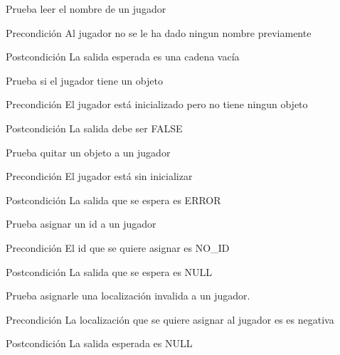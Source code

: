 \begin{DoxyRefList}
\item[\label{test__test000218}%
\hypertarget{test__test000218}{}%
Global \hyperlink{player__test_8c_a47ca2429d85f332295322002954e1c89}{test3\-\_\-player\-\_\-get\-\_\-name} ()]Prueba leer el nombre de un jugador \begin{DoxyPrecond}{Precondición}
Al jugador no se le ha dado ningun nombre previamente 
\end{DoxyPrecond}
\begin{DoxyPostcond}{Postcondición}
La salida esperada es una cadena vacía  
\end{DoxyPostcond}

\item[\label{test__test000002}%
\hypertarget{test__test000002}{}%
Global \hyperlink{player__test_8c_a956409720fca92e245d798491200f3d6}{test3\-\_\-player\-\_\-has\-\_\-object} ()]Prueba si el jugador tiene un objeto \begin{DoxyPrecond}{Precondición}
El jugador está inicializado pero no tiene ningun objeto 
\end{DoxyPrecond}
\begin{DoxyPostcond}{Postcondición}
La salida debe ser F\-A\-L\-S\-E  
\end{DoxyPostcond}

\item[\label{test__test000227}%
\hypertarget{test__test000227}{}%
Global \hyperlink{player__test_8c_af84155cb375301e75475a91ef522e191}{test3\-\_\-player\-\_\-remove\-\_\-object} ()]Prueba quitar un objeto a un jugador \begin{DoxyPrecond}{Precondición}
El jugador está sin inicializar 
\end{DoxyPrecond}
\begin{DoxyPostcond}{Postcondición}
La salida que se espera es E\-R\-R\-O\-R  
\end{DoxyPostcond}

\item[\label{test__test000209}%
\hypertarget{test__test000209}{}%
Global \hyperlink{player__test_8c_a721899e78b1e5e9e483fcc75f44fdf09}{test3\-\_\-player\-\_\-set\-\_\-id} ()]Prueba asignar un id a un jugador \begin{DoxyPrecond}{Precondición}
El id que se quiere asignar es N\-O\-\_\-\-I\-D 
\end{DoxyPrecond}
\begin{DoxyPostcond}{Postcondición}
La salida que se espera es N\-U\-L\-L  
\end{DoxyPostcond}

\item[\label{test__test000212}%
\hypertarget{test__test000212}{}%
Global \hyperlink{player__test_8c_a317c0c84ef6ef843c15d5bab4a6b8a38}{test3\-\_\-player\-\_\-set\-\_\-location} ()]Prueba asignarle una localización invalida a un jugador. \begin{DoxyPrecond}{Precondición}
La localización que se quiere asignar al jugador es es negativa 
\end{DoxyPrecond}
\begin{DoxyPostcond}{Postcondición}
La salida esperada es N\-U\-L\-L  
\end{DoxyPostcond}


\end{DoxyRefList}
